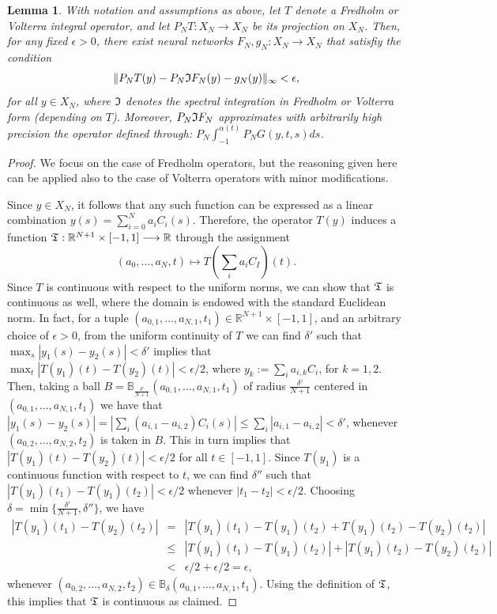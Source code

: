 \documentclass[11pt,fleqn]{amsart} %
\newtheorem{lemma}[theorem]{Lemma}
\begin{document}
	\begin{lemma}\label{lem:spec_approximation}
		With notation and assumptions as above, let $T$ denote a Fredholm or Volterra integral operator, and let $P_NT : X_N \longrightarrow X_N$ be its projection on $X_N$. Then, for any fixed $\epsilon > 0$, there exist neural networks $F_N, g_N: X_N \longrightarrow X_N$ that satisfiy the condition
		$$
		\|P_NT(y) - P_N \frak I F_N(y) - g_N(y)\|_\infty < \epsilon,
		$$
		for all $y\in X_N$, where $\frak I$ denotes the spectral integration in Fredholm or Volterra form (depending on $T$). Moreover, $P_N \frak I F_N$ approximates with arbitrarily high precision the operator defined through: $P_N\int_{-1}^{\alpha(t)} P_NG(y,t,s)ds$. 
	\end{lemma}
	\begin{proof}
		We focus on the case of Fredholm operators, but the reasoning given here can be applied also to the case of Volterra operators with minor modifications. 
		
		Since $y\in X_N$, it follows that any such function can be expressed as a linear combination $y(s) = \sum_{i=0}^N a_i C_i(s)$. Therefore, the operator $T(y)$ induces a function $\frak T: \mathbb R^{N+1}\times [-1,1] \longrightarrow \mathbb R$ through the assignment 
		$$
		(a_0, \ldots , a_N, t) \mapsto T(\sum_i a_i C_I)(t). 
		$$
		Since $T$ is continuous with respect to the uniform norms, we can show that $\frak T$ is continuous as well, where the domain is endowed with the standard Euclidean norm. In fact, for a tuple $(a_{0,1}, \ldots , a_{N,1},t_1)\in \mathbb R^{N+1}\times [-1,1]$, and an  arbitrary choice of $\epsilon >0$, from the uniform continuity of $T$ we can find $\delta'$ such that $\max_s |y_1(s) - y_2(s)| < \delta'$ implies that $\max_t |T(y_1)(t) - T(y_2)(t)| < \epsilon/2$, where $y_k := \sum_i a_{i,k} C_i$, for $k=1,2$.  Then, taking a ball $B = \mathbb B_{\frac{\delta'}{N+1}}(a_{0,1}, \ldots , a_{N,1}, t_1)$ of radius $\frac{\delta'}{N+1}$ centered in $(a_{0,1}, \ldots , a_{N,1}, t_1)$ we have that $|y_1(s) - y_2(s)| = |\sum_i (a_{i,1}-a_{i,2})C_i(s)| \leq \sum_i |a_{i,1} - a_{i,2}| < \delta'$, whenever $(a_{0,2}, \ldots, a_{N,2},t_2)$ is taken in $B$. This in turn implies that $|T(y_1)(t) - T(y_2)(t)| < \epsilon/2$ for all $t\in [-1,1]$. Since $T(y_1)$ is a continuous function with respect to $t$, we can find $\delta''$ such that $|T(y_1)(t_1) - T(y_1)(t_2)| < \epsilon/2$ whenever $|t_1 - t_2|<\epsilon/2$. Choosing $\delta = \min \{\frac{\delta'}{N+1}, \delta''\}$, we have
		\begin{eqnarray*}
			|T(y_1)(t_1) - T(y_2)(t_2)| &=& |T(y_1)(t_1)- T(y_1)(t_2) + T(y_1)(t_2)  - T(y_2)(t_2)|\\
			&\leq& |T(y_1)(t_1)- T(y_1)(t_2)| + |T(y_1)(t_2)  - T(y_2)(t_2)|\\
			&<& \epsilon/2 + \epsilon/2 = \epsilon,
		\end{eqnarray*}
		whenever $(a_{0,2}, \ldots , a_{N,2}, t_2) \in  \mathbb B_{\delta}(a_{0,1}, \ldots , a_{N,1}, t_1)$. Using the definition of $\frak T$, this implies that $\frak T$ is continuous as claimed. 
		

\end{proof}
\end{document}

